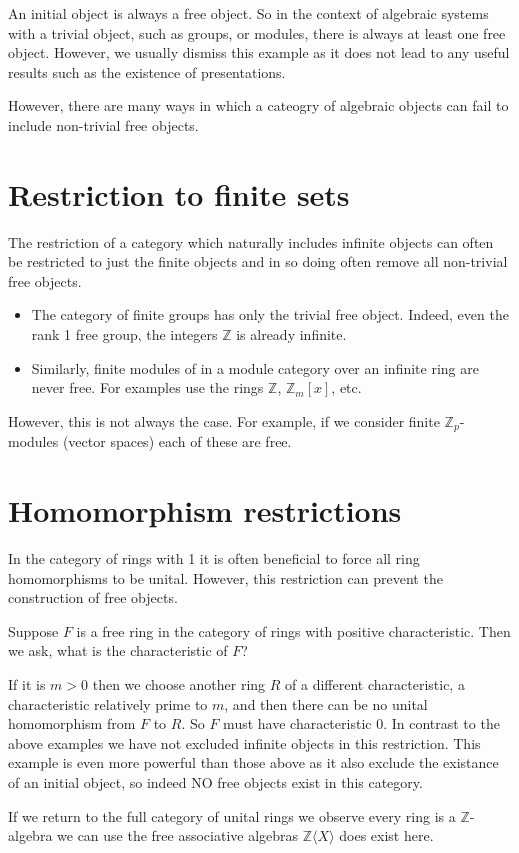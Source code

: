 \documentclass[12pt]{article}
\begin{document}
An initial object is always a free object.  So in the context of algebraic
systems with a trivial object, such as groups, or modules, there is always
at least one free object.  However, we usually dismiss this example as it
does not lead to any useful results such as the existence of presentations.

However, there are many ways in which a cateogry of algebraic objects can
fail to include non-trivial free objects.

\section{Restriction to finite sets}

The restriction of a category which naturally includes infinite objects
can often be restricted to just the finite objects and in so doing often
remove all non-trivial free objects.
\begin{itemize}
\item The category of finite groups has only the trivial free object.  Indeed,
even the rank 1 free group, the integers $\mathbb{Z}$ is already infinite.
\item Similarly, finite modules of in a module category over an infinite 
ring are never free. For examples use the rings $\mathbb{Z}$, $\mathbb{Z}_m[x]$,
etc.
\end{itemize}

However, this is not always the case.  For example, if we consider finite
$\mathbb{Z}_p$-modules (vector spaces) each of these are free.

\section{Homomorphism restrictions}

In the category of rings with 1 it is often beneficial to force all ring
homomorphisms to be unital.  However, this restriction can prevent
the construction of free objects.

Suppose $F$ is a free ring in the category of rings with positive characteristic.  Then we ask, what is the characteristic of $F$?

If it is $m>0$ then we choose another ring $R$ of a different characteristic,
a characteristic relatively prime to $m$, and then there can be no 
unital homomorphism from $F$ to $R$.  So $F$ must have characteristic 0.
In contrast to the above examples we have not excluded infinite objects
in this restriction.  This example is even more powerful than those
above as it also exclude the existance of an initial object, so indeed
NO free objects exist in this category.

If we return to the full category of unital rings we observe
every ring is a $\mathbb{Z}$-algebra we can use the free associative
algebras $\mathbb{Z}\langle X\rangle$ does exist here.

\end{document}
